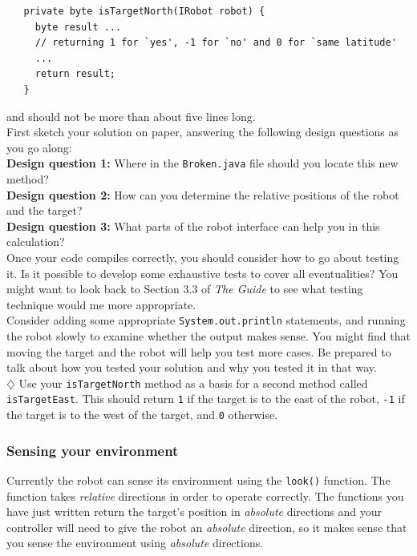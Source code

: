 \begin{verbatim}
   private byte isTargetNorth(IRobot robot) {
     byte result ...
     // returning 1 for `yes', -1 for `no' and 0 for `same latitude'
     ...
     return result;
   }
\end{verbatim}

\noindent
and should not be more than about five lines long.\\

\noindent
First sketch your solution on
paper, answering the following design questions as you go along: \\

\noindent
{\bf Design question 1:} Where in the
{\tt Broken.java} file should you locate this new method? \\

\noindent
{\bf Design question 2:} How can you determine the relative positions of 
the robot and the target? \\

\noindent
{\bf Design question 3:} What parts of the robot interface can help you 
in this calculation? \\

\noindent
Once your code compiles correctly, you should consider how to go about 
testing it. Is it possible to develop some exhaustive tests to cover all 
eventualities? You might want to look back to Section 3.3 of
{\em The Guide} to see what testing technique would me more appropriate.\\

\noindent
Consider adding some appropriate {\tt System.out.println} statements, 
and running the robot slowly to examine whether the output makes sense. 
You might find that moving the target and the robot will help you test 
more cases. Be prepared to talk about how you tested your solution and 
why you tested it in that way. \\

\noindent
$\diamondsuit$ Use your {\tt isTargetNorth} method as a basis for a second method
called {\tt isTargetEast}. This should return {\tt 1} if the target is to the 
east of the robot, {\tt -1} if the target is to the west of the target, and 
{\tt 0} otherwise.

\subsubsection{Sensing your environment}

\noindent
Currently the robot can sense its environment using the {\tt look()} function.
The function takes {\it relative} directions in order to operate correctly. The 
functions you have just written return the target's position in {\it absolute} directions 
and your controller will need to give the robot an {\it absolute} direction, so it makes
sense that you sense the environment using {\it absolute} directions. \\

